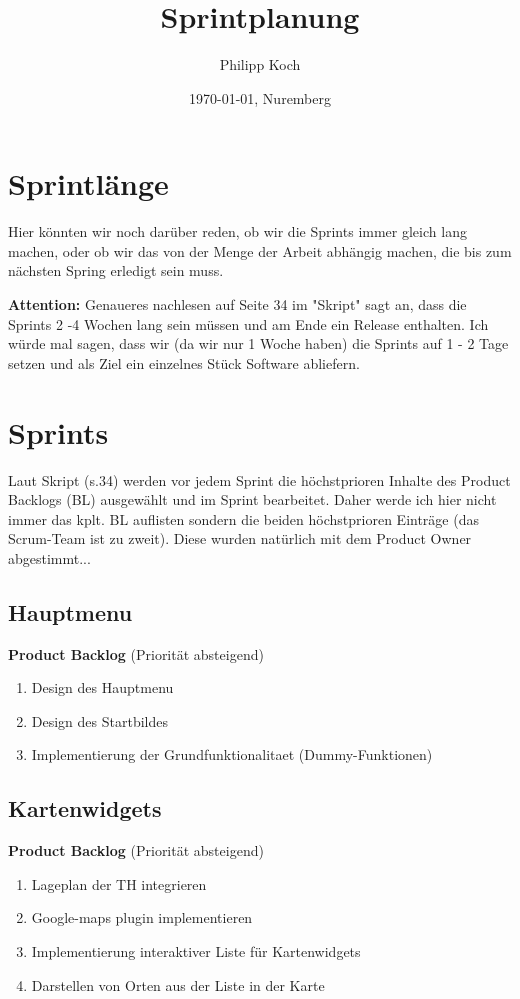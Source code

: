 \documentclass[12pt]{scrartcl}
\title{Sprintplanung}
\author{Philipp Koch}
\date{\today{}, Nuremberg}
\begin{document}
\maketitle

\section{Sprintlänge}
Hier könnten wir noch darüber reden, ob wir die Sprints immer gleich lang machen, oder ob wir das von der Menge der Arbeit abhängig machen, die bis zum nächsten Spring erledigt sein muss.

\textbf{Attention:} Genaueres nachlesen auf Seite 34 im "Skript" sagt an, dass die Sprints 2 -4 Wochen lang sein müssen und am Ende ein Release enthalten. Ich würde mal sagen, dass wir (da wir nur 1 Woche haben) die Sprints auf 1 - 2 Tage setzen und als Ziel ein einzelnes Stück Software abliefern.
\section{Sprints}
Laut Skript (s.34) werden vor jedem Sprint die höchstprioren Inhalte des Product Backlogs (BL) ausgewählt und im Sprint bearbeitet. Daher werde ich hier nicht immer das kplt. BL auflisten sondern die beiden höchstprioren Einträge (das Scrum-Team ist zu zweit). Diese wurden natürlich mit dem Product Owner abgestimmt... 
\subsection{Hauptmenu}
\textbf{Product Backlog} (Priorität absteigend)
\begin{enumerate}
\item Design des Hauptmenu
\item Design des Startbildes
\item Implementierung der Grundfunktionalitaet (Dummy-Funktionen) 
\end{enumerate}
\subsection{Kartenwidgets}
\textbf{Product Backlog} (Priorität absteigend)
\begin{enumerate}
	\item Lageplan der TH integrieren
	\item Google-maps plugin implementieren
	\item Implementierung interaktiver Liste für Kartenwidgets
	\item Darstellen von Orten aus der Liste in der Karte 
\end{enumerate}
\end{document}
